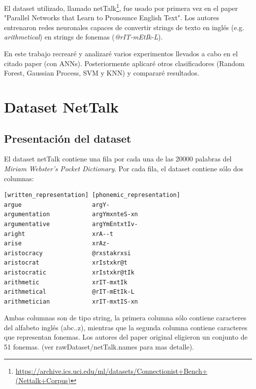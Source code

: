 \documentclass[paper=a4, fontsize=11pt]{scrartcl} %
\numberwithin{equation}{section} %
\numberwithin{figure}{section} %
\numberwithin{table}{section} %
\begin{document}
\par El dataset utilizado, llamado netTalk\footnote{\url{https://archive.ics.uci.edu/ml/datasets/Connectionist+Bench+(Nettalk+Corpus)}}, fue usado por primera vez en el paper  "Parallel Networks that Learn to Pronounce English Text"\cite{parallel}. Los autores entrenaron redes neuronales capaces de convertir strings de texto en inglés (e.g. \textit{arithmetical}) en strings de fonemas (\textit{@rIT-mEtIk-L}).\\


	

    

\par En este trabajo recrearé y analizaré varios experimentos llevados a cabo en el citado paper (con ANNs). Posteriormente aplicaré otros clasificadores (Random Forest, Gaussian Process, SVM y KNN) y compararé resultados.

\section{Dataset NetTalk}

\subsection{Presentación del dataset}
El dataset netTalk contiene una fila por cada una de las 20000 palabras del \textit{Miriam Webster’s Pocket Dictionary}. Por cada fila, el dataset contiene sólo dos columnas: \\

\begin{center}

\begin{BVerbatim}
[written_representation] [phonemic_representation]
argue                    argY-   
argumentation            argYmxnteS-xn   
argumentative            argYmEntxtIv-   
aright                   xrA--t   
arise                    xrAz-   
aristocracy              @rxstakrxsi   
aristocrat               xrIstxkr@t   
aristocratic             xrIstxkr@tIk   
arithmetic               xrIT-mxtIk   
arithmetical             @rIT-mEtIk-L   
arithmetician            xrIT-mxtIS-xn   
\end{BVerbatim}

\end{center}

Ambas columnas son de tipo string, la primera columna sólo contiene caracteres del alfabeto inglés (abc..z), mientras que la segunda columna contiene caracteres que representan fonemas. Los autores del paper original eligieron un conjunto de 51 fonemas. (ver rawDataset/netTalk.names para mas detalle).\\
\end{document}
